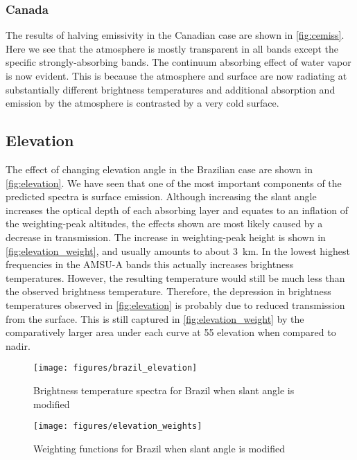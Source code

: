 \documentclass[twocol]{ametsoc}
\begin{document}
\subsubsection{Canada}

The results of halving emissivity in the Canadian case are shown in \autoref{fig:cemiss}.
Here we see that the atmosphere is mostly transparent in all bands except the specific strongly-absorbing bands.
The continuum absorbing effect of water vapor is now evident.
This is because the atmosphere and surface are now radiating at substantially different brightness temperatures and additional absorption and emission by the atmosphere is contrasted by a very cold surface. 

\subsection{Elevation}

The effect of changing elevation angle in the Brazilian case are shown in \autoref{fig:elevation}.
We have seen that one of the most important components of the predicted spectra is surface emission.
Although increasing the slant angle increases the optical depth of each absorbing layer and equates to an inflation of the weighting-peak altitudes, the effects shown are most likely caused by a decrease in transmission.
The increase in weighting-peak height is shown in \autoref{fig:elevation_weight}, and usually amounts to about 3~km.
In the lowest highest frequencies in the AMSU-A bands this actually increases brightness temperatures.
However, the resulting temperature would still be much less than the observed brightness temperature.
Therefore, the depression in brightness temperatures observed in \autoref{fig:elevation} is probably due to reduced transmission from the surface.
This is still captured in \autoref{fig:elevation_weight} by the comparatively larger area under each curve at 55\degree{} elevation when compared to nadir.

\begin{figure}
	\centering
	\texttt{[image: figures/brazil\_elevation]}
	\caption{Brightness temperature spectra for Brazil when slant angle is modified}
	\label{fig:elevation}
\end{figure}

\begin{figure}
	\centering
	\texttt{[image: figures/elevation\_weights]}
	\caption{Weighting functions for Brazil when slant angle is modified}
	\label{fig:elevation_weight}
\end{figure}
\end{document}
